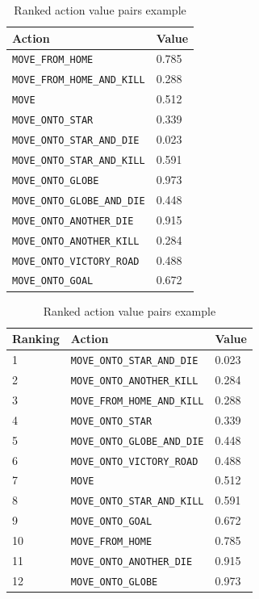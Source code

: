 \begin{table}[!htb]
    \begin{minipage}[b]{.5\linewidth}
		\centering
		\caption{Action value pairs example}
		\label{tab:action-value-paris-example}
        \begin{tabular}{|l|l|} \hline
			Action & Value \\ \hline
			\texttt{MOVE\_FROM\_HOME} & 0.785\\
			\texttt{MOVE\_FROM\_HOME\_AND\_KILL} & 0.288\\
			\texttt{MOVE} & 0.512\\
			\texttt{MOVE\_ONTO\_STAR} & 0.339\\
			\texttt{MOVE\_ONTO\_STAR\_AND\_DIE} & 0.023\\
			\texttt{MOVE\_ONTO\_STAR\_AND\_KILL} & 0.591\\
			\texttt{MOVE\_ONTO\_GLOBE} & 0.973\\
			\texttt{MOVE\_ONTO\_GLOBE\_AND\_DIE} & 0.448\\
			\texttt{MOVE\_ONTO\_ANOTHER\_DIE} & 0.915\\
			\texttt{MOVE\_ONTO\_ANOTHER\_KILL} & 0.284\\
			\texttt{MOVE\_ONTO\_VICTORY\_ROAD} & 0.488\\
			\texttt{MOVE\_ONTO\_GOAL} & 0.672\\	\hline
        \end{tabular}
    \end{minipage}%
	\begin{minipage}[b]{.5\linewidth}
      \centering
	  \caption{Ranked action value pairs example}
	  \label{tab:ranked-action-value-pair-example}
	  	\begin{tabular}{|l|l|l|}\hline
			Ranking & Action & Value \\ \hline
			1& \texttt{MOVE\_ONTO\_STAR\_AND\_DIE}  & 0.023\\
			2& \texttt{MOVE\_ONTO\_ANOTHER\_KILL}   & 0.284\\
			3& \texttt{MOVE\_FROM\_HOME\_AND\_KILL} & 0.288\\
			4& \texttt{MOVE\_ONTO\_STAR}            & 0.339\\
			5& \texttt{MOVE\_ONTO\_GLOBE\_AND\_DIE} & 0.448\\
			6& \texttt{MOVE\_ONTO\_VICTORY\_ROAD}   & 0.488\\
			7& \texttt{MOVE}                        & 0.512\\
			8& \texttt{MOVE\_ONTO\_STAR\_AND\_KILL} & 0.591\\
			9& \texttt{MOVE\_ONTO\_GOAL}            & 0.672\\
			10& \texttt{MOVE\_FROM\_HOME}            & 0.785\\
			11& \texttt{MOVE\_ONTO\_ANOTHER\_DIE}    & 0.915\\
			12& \texttt{MOVE\_ONTO\_GLOBE}           & 0.973\\ \hline
		\end{tabular}
	\end{minipage} 
\end{table}

